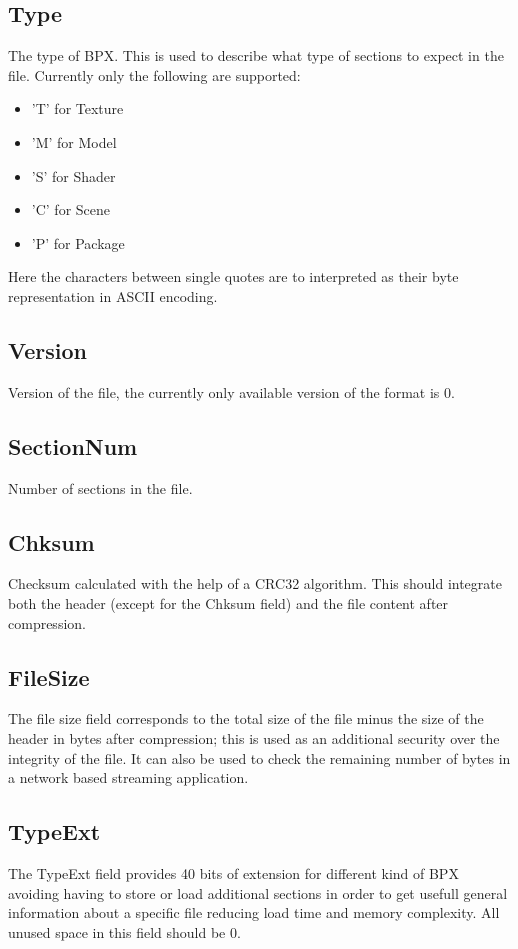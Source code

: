 \subsection{Type}
The type of BPX. This is used to describe what type of sections to expect in the file.\newline
Currently only the following are supported:
\begin{itemize}
    \item 'T' for Texture
    \item 'M' for Model
    \item 'S' for Shader
    \item 'C' for Scene
    \item 'P' for Package
\end{itemize}
Here the characters between single quotes are to interpreted as their byte representation in ASCII encoding.

\subsection{Version}
Version of the file, the currently only available version of the format is 0.

\subsection{SectionNum}
Number of sections in the file.

\subsection{Chksum}
Checksum calculated with the help of a CRC32 algorithm. This should integrate both the header (except for the Chksum field) and the file content after compression.

\subsection{FileSize}
The file size field corresponds to the total size of the file minus the size of the header in bytes after compression; this is used as an additional security over the integrity of the file. It can also be used to check the remaining number of bytes in a network based streaming application.

\subsection{TypeExt}
The TypeExt field provides 40 bits of extension for different kind of BPX avoiding having to store or load additional sections in order to get usefull general information about a specific file reducing load time and memory complexity.\newline
All unused space in this field should be 0.
